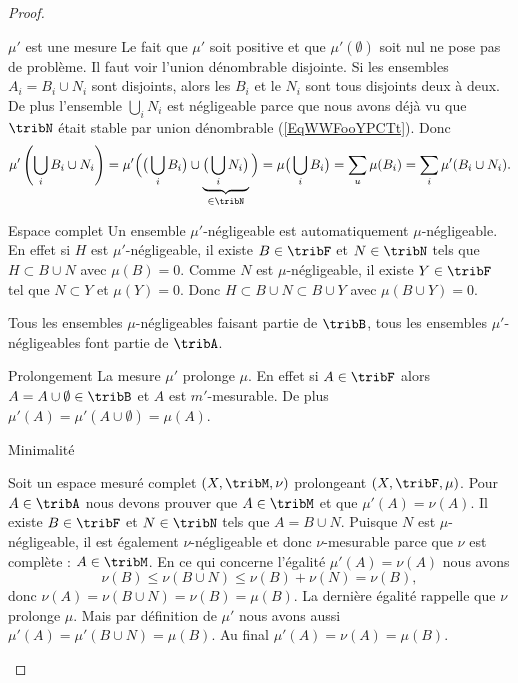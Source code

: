 \begin{proof}
\begin{subproof}
        \item[\( \mu'\) est une mesure]
            Le fait que \( \mu'\) soit positive et que \( \mu'(\emptyset)\) soit nul ne pose pas de problème. Il faut voir l'union dénombrable disjointe. Si les ensembles \( A_i=B_i\cup N_i\) sont disjoints, alors les \( B_i\) et le \( N_i\) sont tous disjoints deux à deux. De plus l'ensemble \( \bigcup_iN_i\) est négligeable parce que nous avons déjà vu que \( \tribN\) était stable par union dénombrable (\ref{EqWWFooYPCTt}). Donc
            \begin{equation}
                \mu'\left( \bigcup_i B_i\cup N_i \right)=\mu'\Big( \big( \bigcup_iB_i \big)\cup\underbrace{\big( \bigcup_iN_i \big)}_{\in\tribN} \Big)=\mu\big( \bigcup_iB_i \big)=\sum_u\mu(B_i)=\sum_i\mu'(B_i\cup N_i).
            \end{equation}

        \item[Espace complet]
            Un ensemble \( \mu'\)-négligeable est automatiquement \( \mu\)-négligeable. En effet si \( H\) est \( \mu'\)-négligeable, il existe \( B\in\tribF\) et \( N\in\tribN\) tels que \( H\subset B\cup N\) avec \( \mu(B)=0\). Comme \( N\) est \( \mu\)-négligeable, il existe \( Y\in\tribF\) tel que \( N\subset Y\) et \( \mu(Y)=0\). Donc \( H\subset B\cup N\subset B\cup Y\) avec \( \mu(B\cup Y)=0\).

            Tous les ensembles \( \mu\)-négligeables faisant partie de \( \tribB\), tous les ensembles \( \mu'\)-négligeables font partie de \( \tribA\).

        \item[Prolongement]
            La mesure \( \mu'\) prolonge \( \mu\). En effet si \( A\in\tribF\) alors \( A=A\cup\emptyset\in\tribB\) et \( A\) est \( m'\)-mesurable. De plus \( \mu'(A)=\mu'(A\cup\emptyset)=\mu(A)\).
        \item[Minimalité]

            Soit un espace mesuré complet \( (X,\tribM,\nu)\) prolongeant \( (X,\tribF,\mu)\). Pour \( A\in\tribA\) nous devons prouver que \( A\in\tribM\) et que \( \mu'(A)=\nu(A)\). Il existe \( B\in\tribF\) et \( N\in\tribN\) tels que \( A=B\cup N\). Puisque \( N\) est \( \mu\)-négligeable, il est également \( \nu\)-négligeable et donc \( \nu\)-mesurable parce que \(\nu\) est complète : \( A\in\tribM\). En ce qui concerne l'égalité \( \mu'(A)=\nu(A)\) nous avons
            \begin{equation}
                \nu(B)\leq\nu(B\cup N)\leq \nu(B)+\nu(N)=\nu(B),
            \end{equation}
            donc \( \nu(A)=\nu(B\cup N)=\nu(B)=\mu(B)\). La dernière égalité rappelle que \( \nu\) prolonge \( \mu\). Mais par définition de \( \mu'\) nous avons aussi \( \mu'(A)=\mu'(B\cup N)=\mu(B)\). Au final \( \mu'(A)=\nu(A)=\mu(B)\).
    \end{subproof}
\end{proof}

